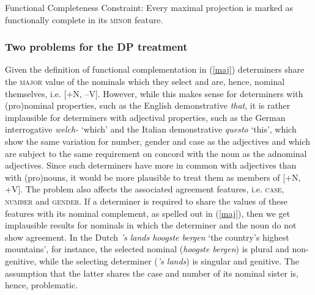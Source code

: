 \documentclass[output=paper
                ,modfonts
                ,nonflat
	        ,collection
	        ,collectionchapter
	        ,collectiontoclongg
 	        ,biblatex
                ,babelshorthands
                ,newtxmath
                ,draftmode
                ,colorlinks, citecolor=brown
]{./langsci/langscibook}
\begin{document}
\begin{exe} 
\ex\label{min} Functional Completeness Constraint: Every maximal projection is marked  
      as functionally complete in its \textsc{minor} feature. 
\end{exe}



\subsubsection{Two problems for the DP treatment}  
\label{prob}


Given the definition of functional complementation in (\ref{maj})
determiners share the \textsc{major} value of the nominals which they select
and are, hence, nominal themselves, i.e. [+N, --V].
However, while this makes sense for determiners with (pro)nominal properties,
such as the English demonstrative \emph{that}, 
it is rather implausible for determiners with adjectival properties,
such as the German interrogative \emph{welch-} `which' and 
the Italian demonstrative \emph{questo} `this', which show the same variation for 
number, gender and case as the adjectives and which are subject to 
the same requirement on concord with the noun as the adnominal adjectives. 
Since such determiners have more in common with adjectives than with (pro)nouns,  
it would be more plausible to treat them as members of [+N, +V].  
The problem also affects the associated agreement features, i.e. \textsc{case}, 
\textsc{number} and \textsc{gender}. If a determiner 
is required to share the values of these features with its nominal complement,
as spelled out in (\ref{maj}), then we get implausible results for nominals in 
which the determiner and the noun do not show agreement.    
In the Dutch \emph{'s lands hoogste bergen} `the country's highest mountains', 
for instance, the selected nominal (\emph{hoogste bergen}) is plural and non-genitive, 
while the selecting determiner (\emph{'s lands}) is singular and genitive.  
The assumption that the latter shares the case and number of its nominal sister 
is, hence, problematic.
\end{document}
